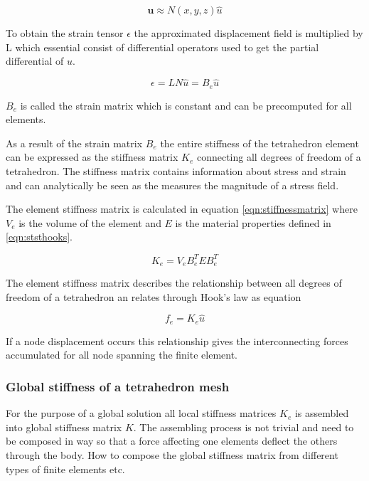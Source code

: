 \documentclass[10pt,a4paper]{article}
\begin{document}
\begin{equation}\label{nio}
    \mathbf{u} \approx N(x,y,z) \hat{u}
\end{equation}

To obtain the strain tensor $\epsilon$ the approximated displacement field is multiplied by L which essential consist of differential operators used to get the partial differential of $u$.

\begin{equation}\label{tio}
    \epsilon = LN \hat{u} = B_ {e} \hat{u}
\end{equation}

$B_ {e}$ is called the strain matrix which is constant and can be precomputed for all elements.

As a result of the strain matrix $B_{e}$ the entire stiffness of the tetrahedron element can be expressed as the stiffness matrix $K_{e}$ connecting all degrees of freedom of a tetrahedron. The stiffness matrix contains information about stress and strain and can analytically be seen as the measures the magnitude of a stress field.

The element stiffness matrix is calculated in equation \ref{eqn:stiffnessmatrix} where $V_{e}$ is the volume of the element and $E$ is the material properties defined in \ref{eqn:ststhooks}.

\begin{equation}\label{eqn:stiffnessmatrix}
    K_{e} = V_{e} B_ {e}^{T}EB_ {e}^{T}
\end{equation}

The element stiffness matrix describes the relationship between all degrees of freedom of a tetrahedron an relates through Hook's law as equation

\begin{equation}\label{eqn:force}
    f_{e} = K_ {e}\hat{u}
\end{equation}

If a node displacement occurs this relationship gives the interconnecting forces accumulated for all node spanning the finite element.

\subsubsection{Global stiffness of a tetrahedron mesh}
For the purpose of a global solution all local stiffness matrices $K_{e}$ is assembled into global stiffness matrix $K$. The assembling process is not trivial and need to be composed in way so that a force affecting one elements deflect the others through the body. How to compose the global stiffness matrix from different types of finite elements etc.
\end{document}
